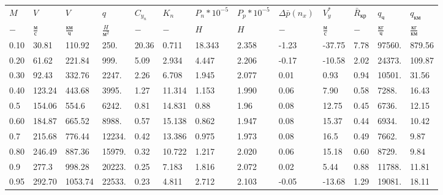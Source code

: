 \begin{tabular}{lllllllllllll}
$M$ & $V$ & $V$ & $q$ & $C_{y_n}$ & $K_n$ & $P_n*10^{-5}$ & $P_p*10^{-5}$ & $\Delta \bar{p}(n_x)$ & $V_y^*$ & $\bar{R}_{кр}$ & $q_{ч}$ & $q_{км}$ \\
$-$ & $\frac{м}{с}$ & $\frac{км}{ч}$ & $\frac{H}{м^2}$ & $-$ & $-$ & $H$ & $H$ & $-$ & $\frac{м}{с}$ & $-$ & $\frac{кг}{ч}$ & $\frac{кг}{км}$ \\
0.10 & 30.81 & 110.92 & 250. & 20.36 & 0.711 & 18.343 & 2.358 & -1.23 & -37.75 & 7.78 & 97560. & 879.56 \\
0.20 & 61.62 & 221.84 & 999. & 5.09 & 2.934 & 4.447 & 2.206 & -0.17 & -10.58 & 2.02 & 24373. & 109.87 \\
0.30 & 92.43 & 332.76 & 2247. & 2.26 & 6.708 & 1.945 & 2.077 & 0.01 & 0.93 & 0.94 & 10501. & 31.56 \\
0.40 & 123.24 & 443.68 & 3995. & 1.27 & 11.314 & 1.153 & 1.990 & 0.06 & 7.90 & 0.58 & 7288. & 16.43 \\
0.5 & 154.06 & 554.6 & 6242. & 0.81 & 14.831 & 0.88 & 1.96 & 0.08 & 12.75 & 0.45 & 6736. & 12.15 \\
0.60 & 184.87 & 665.52 & 8988. & 0.57 & 15.138 & 0.862 & 1.947 & 0.08 & 15.37 & 0.44 & 6934. & 10.42 \\
0.7 & 215.68 & 776.44 & 12234. & 0.42 & 13.386 & 0.975 & 1.973 & 0.08 & 16.5 & 0.49 & 7662. & 9.87 \\
0.80 & 246.49 & 887.36 & 15979. & 0.32 & 10.722 & 1.217 & 2.020 & 0.06 & 15.18 & 0.60 & 8729. & 9.84 \\
0.9 & 277.3 & 998.28 & 20223. & 0.25 & 7.183 & 1.816 & 2.072 & 0.02 & 5.44 & 0.88 & 11788. & 11.81 \\
0.95 & 292.70 & 1053.74 & 22533. & 0.23 & 4.811 & 2.712 & 2.103 & -0.05 & -13.68 & 1.29 & 19081. & 18.11 \\
\end{tabular}
